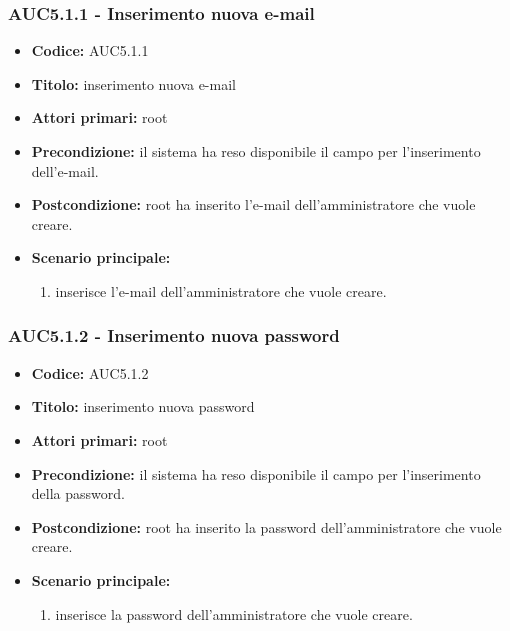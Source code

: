 \documentclass[casi-duso]{subfiles}
\begin{document}
\subsubsection{AUC5.1.1 - Inserimento nuova e-mail}%
\label{subsub:AUC5.1.1}
\begin{itemize}
  \item \textbf{Codice:} AUC5.1.1
  \item \textbf{Titolo:} inserimento nuova e-mail
  \item \textbf{Attori primari:} root
  \item \textbf{Precondizione:} il sistema ha reso disponibile il campo per l'inserimento dell'e-mail.
  \item \textbf{Postcondizione:} root ha inserito l'e-mail dell'amministratore che vuole creare.
  \item \textbf{Scenario principale:}
  \begin{enumerate}
    \item {} inserisce l'e-mail dell'amministratore che vuole creare.
  \end{enumerate}
\end{itemize}

\subsubsection{AUC5.1.2 - Inserimento nuova password}%
\label{subsub:AUC5.1.2}
\begin{itemize}
  \item \textbf{Codice:} AUC5.1.2
  \item \textbf{Titolo:} inserimento nuova password
  \item \textbf{Attori primari:} root
  \item \textbf{Precondizione:} il sistema ha reso disponibile il campo per l'inserimento della password.
  \item \textbf{Postcondizione:} root ha inserito la password dell'amministratore che vuole creare.
  \item \textbf{Scenario principale:}
  \begin{enumerate}
    \item {} inserisce la password dell'amministratore che vuole creare.
  \end{enumerate}
\end{itemize}
\end{document}
